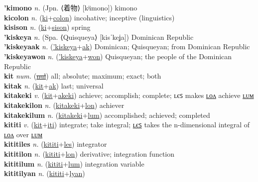\textbf{'kimono} \textit{n.} (Jpn. ⟨着物⟩ [kʲimono])
kimono \label{'kimono} \\
\textbf{kicolon} \textit{n.} (\hyperref[ki]{ki}+\hyperref[colon]{colon})
incohative; inceptive (linguistics) \label{kicolon} \\
\textbf{kisison} \textit{n.} (\hyperref[ki]{ki}+\hyperref[sison]{sison})
spring \label{kisison} \\
\textbf{'kiskeya} \textit{n.} (Spa. ⟨Quisqueya⟩ [kisˈkeʝa])
Dominican Republic \label{'kiskeya} \\
\textbf{'kiskeyaak} \textit{n.} (\hyperref['kiskeya]{'kiskeya}+\hyperref[ak]{ak})
Dominican; Quisqueyan; from Dominican Republic \label{'kiskeyaak} \\
\textbf{'kiskeyawon} \textit{n.} (\hyperref['kiskeya]{'kiskeya}+\hyperref[won]{won})
Quisqueyan; the people of the Dominican Republic \label{'kiskeyawon} \\
\textbf{kit} \textit{num.} (\hyperref[nul]{\sout{nul}})
all; absolute; maximum; exact; both \label{kit} \\
\textbf{kitak} \textit{n.} (\hyperref[kit]{kit}+\hyperref[ak]{ak})
last; universal \label{kitak} \\
\textbf{kitakeki} \textit{v.} (\hyperref[kit]{kit}+\hyperref[akeki]{akeki})
achieve; accomplish; complete; ʟєꜱ makes \hyperref[kitakekilon]{ʟᴏᴧ} achieve \hyperref[kitakekilum]{ʟᴜᴍ} \label{kitakeki} \\
\textbf{kitakekilon} \textit{n.} (\hyperref[kitakeki]{kitakeki}+\hyperref[lon]{lon})
achiever \label{kitakekilon} \\
\textbf{kitakekilum} \textit{n.} (\hyperref[kitakeki]{kitakeki}+\hyperref[lum]{lum})
accomplished; achieved; completed \label{kitakekilum} \\
\textbf{kititi} \textit{v.} (\hyperref[kit]{kit}+\hyperref[iti]{iti})
integrate; take integral; \hyperref[kititiles]{ʟєꜱ} takes the n-dimensional integral of \hyperref[kititilon]{ʟᴏᴧ} over \hyperref[kititilum]{ʟᴜᴍ} \label{kititi} \\
\textbf{kititiles} \textit{n.} (\hyperref[kititi]{kititi}+\hyperref[les]{les})
integrator \label{kititiles} \\
\textbf{kititilon} \textit{n.} (\hyperref[kititi]{kititi}+\hyperref[lon]{lon})
derivative; integration function \label{kititilon} \\
\textbf{kititilum} \textit{n.} (\hyperref[kititi]{kititi}+\hyperref[lum]{lum})
integration variable \label{kititilum} \\
\textbf{kititilyan} \textit{n.} (\hyperref[kititi]{kititi}+\hyperref[lyan]{lyan})
